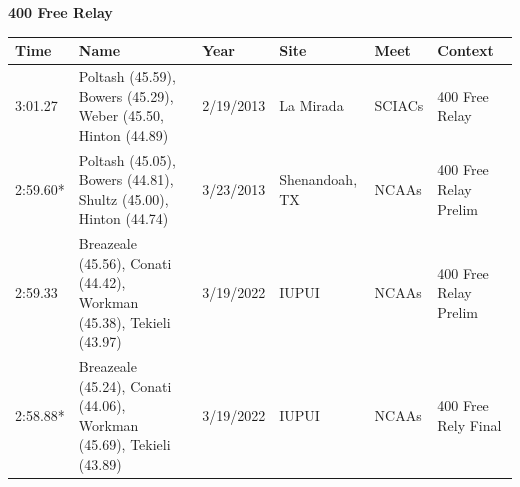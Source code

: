 \begin{table}[H]
\centering
\begin{minipage}[t]{0.6\textwidth}
\centering
\textbf{400 Free Relay}\\[0.1cm]
\begin{tabular}{@{}p{1.8cm}p{2.8cm}p{1.2cm}p{1.4cm}p{1.4cm}p{2.0cm}@{}}
\hline
    \textbf{Time} & \textbf{Name} & \textbf{Year} & \textbf{Site} & \textbf{Meet} & \textbf{Context} \\
\hline
    3:01.27 & Poltash (45.59), Bowers (45.29), Weber (45.50, Hinton (44.89) & 2/19/2013 & La Mirada & SCIACs & 400 Free Relay \\
    2:59.60* & Poltash (45.05), Bowers (44.81), Shultz (45.00), Hinton (44.74) & 3/23/2013 & Shenandoah, TX & NCAAs & 400 Free Relay Prelim \\
    2:59.33 & Breazeale (45.56), Conati (44.42), Workman (45.38), Tekieli (43.97) & 3/19/2022 & IUPUI & NCAAs & 400 Free Relay Prelim \\
    2:58.88* & Breazeale (45.24), Conati (44.06), Workman (45.69), Tekieli (43.89) & 3/19/2022 & IUPUI & NCAAs & 400 Free Rely Final \\
\hline
\end{tabular}
\end{minipage}
\end{table}

